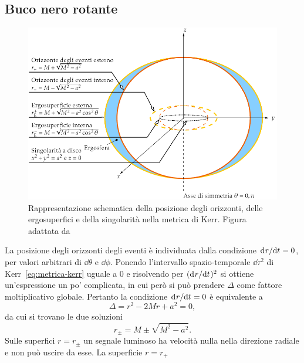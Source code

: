 \subsection{Buco nero rotante}
\label{sec:orizzonte-kerr}

\begin{figure}
  \centering
  \includegraphics[width=\textwidth]{figure/kerr}
  \caption[Rappresentazione schematica della posizione degli orizzonti, delle
  ergosuperfici e della singolarità nella metrica di Kerr]{Rappresentazione
    schematica della posizione degli orizzonti, delle ergosuperfici e della
    singolarità nella metrica di Kerr.  Figura adattata
    da~\textcite{2007arXiv0706.0622V}}
  \label{fig:geometria-kerr}
\end{figure}
La posizione degli orizzonti degli eventi è individuata dalla condizione
\(\mathrm{d}^{}r / \mathrm{d} {t}^{} = 0\), per valori arbitrari di \(\dd\theta\) e \(\dd\phi\).
Ponendo l'intervallo spazio-temporale \(\dd\tau^{2}\) di
Kerr~\eqref{eq:metrica-kerr} uguale a \(0\) e risolvendo per
\((\mathrm{d}^{}r / \mathrm{d} {t}^{})^{2}\) si ottiene un'espressione un po' complicata, in cui però
si può prendere \(\Delta\) come fattore moltiplicativo globale.  Pertanto la
condizione \(\mathrm{d}^{}r / \mathrm{d} {t}^{} = 0\) è equivalente a
\begin{equation}
  \Delta = r^{2} - 2Mr + a^{2} = 0,
\end{equation}
da cui si trovano le due soluzioni
\begin{equation}
  r_{\pm} = M \pm \sqrt{M^{2} - a^{2}}.
\end{equation}
Sulle superfici \(r = r_{\pm}\) un segnale luminoso ha velocità nulla nella
direzione radiale e non può uscire da esse.  La superficie \(r = r_{+}\)
